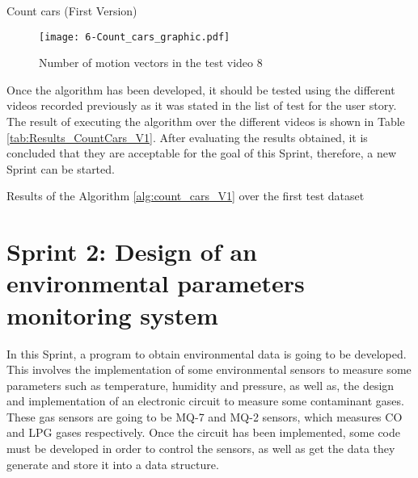 \begin{algorithm}
{{{			}
		}	
	}
	\caption{Count cars (First Version)}\label{alg:count_cars_V1}
\end{algorithm}\DecMargin{1em}

\begin{figure}[!h]
	\begin{center}
		\texttt{[image: 6-Count\_cars\_graphic.pdf]}
		\caption{Number of motion vectors in the test video 8}
		\label{fig:6-Count_cars_graphic}
	\end{center}
\end{figure}

Once the algorithm has been developed, it should be tested using the different videos recorded previously as it was stated in the list of test for the user story. The result of executing the algorithm over the different videos is shown in Table \ref{tab:Results_CountCars_V1}. After evaluating the results obtained, it is concluded that they are acceptable for the goal of this Sprint, therefore, a new Sprint can be started.

\begin{table}[hp]
	\centering
	{\small
		
	}
	\caption{Results of the Algorithm \ref{alg:count_cars_V1} over the first test dataset}
	\label{tab:Results_CountCars_V1}
\end{table}





\section{Sprint 2: Design of an environmental parameters monitoring system}
In this Sprint, a program to obtain environmental data is going to be developed. This involves the implementation of some environmental sensors to measure some parameters such as temperature, humidity and pressure, as well as, the design and implementation of an electronic circuit to measure some contaminant gases. These gas sensors are going to be MQ-7 and MQ-2 sensors, which measures CO and LPG gases respectively. Once the circuit has been implemented, some code must be developed in order to control the sensors, as well as get the data they generate and store it into a data structure.

